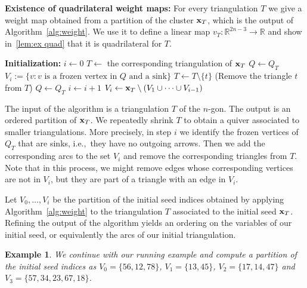 \documentclass[10pt,a4paper]{amsart}
\newcommand{\thref}[1]{\ref{#1}}
\newtheorem{Example}[Theorem]{Example}
\numberwithin{equation}{section}
\begin{document}
\noindent
{\bf Existence of quadrilateral weight maps:} For every triangulation $T$ we give a weight map obtained from a partition of the cluster ${\bf x}_T$, which is the output of Algorithm~\ref{alg:weight}.
We use it to define a linear map $v_T\colon \mathbb R^{2n-3}\to \mathbb R$ and show in~\thref{lem:ex quad} that it is quadrilateral for $T$.
\begin{algorithm}
\caption{Partitioning the cluster ${\bf x}_T$
based on its triangulation $T$ (union of triangles).
}
\label{alg:weight}

\BlankLine
{}
\BlankLine
{\bf Initialization:}
$i\leftarrow 0$\;
$T\leftarrow$ the corresponding triangulation of ${\bf x}_T$\;
$Q\leftarrow Q_T$\;
\BlankLine
{}
{
\BlankLine
$V_i:=\{v \colon v\text{ is a frozen vertex in } Q \text{ and a sink}\}$\;
{
{
$T\leftarrow T\setminus \{t\}$ (Remove the triangle $t$ from $T$)\;
$Q\leftarrow Q_T$\;
}
}
$i\leftarrow i+1$\;
}
$V_i\leftarrow {\bf x}_T\setminus (V_1\cup \cdots\cup V_{i-1})$\;
\;
\end{algorithm}

\medskip

The input of the algorithm is a triangulation $T$ of the $n$-gon. The output is an ordered partition of ${\bf x}_T$.
We repeatedly shrink $T$ to obtain a quiver associated to smaller triangulations.
More precisely, in step $i$ we identify the frozen vertices of $Q_T$ that are sinks, i.e.,~they have no outgoing arrows.
Then we add the corresponding arcs to the set $V_i$ and remove the corresponding triangles from $T$.
Note that in this process, we might remove edges whose corresponding vertices are not in $V_i$, but they are part of a triangle with an edge in $V_i$.

Let $V_0,\dots,V_i$ be the partition of the initial seed indices obtained by applying Algorithm~\ref{alg:weight} to the triangulation $T$ associated to the initial seed ${\bf x}_T$.
Refining the output of the algorithm yields an ordering on the variables of our initial seed, or equivalently the arcs of our initial triangulation.

\begin{Example}
We continue with our running example and compute a partition of the initial seed indices as $V_0=\{56,12,78\}$, $V_1=\{13,45\}$, $V_{2}=\{17,14,47\}$ and $V_{3}=\{57,34,23,67,18\}$.
\end{Example}
\end{document}
